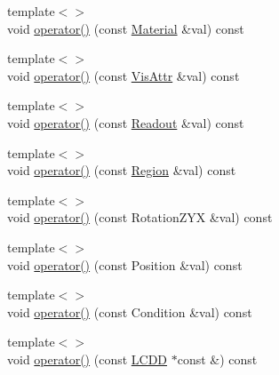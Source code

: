 \begin{DoxyCompactItemize}
\item 
{\footnotesize template$<$$>$ }\\void \hyperlink{struct_d_d4hep_1_1_printer_a28d6e698fccdabcfda67d3460012355a}{operator()} (const \hyperlink{class_d_d4hep_1_1_geometry_1_1_material}{Material} \&val) const
\item 
{\footnotesize template$<$$>$ }\\void \hyperlink{struct_d_d4hep_1_1_printer_a75af40a21128f843605984b619878a7e}{operator()} (const \hyperlink{class_d_d4hep_1_1_geometry_1_1_vis_attr}{VisAttr} \&val) const
\item 
{\footnotesize template$<$$>$ }\\void \hyperlink{struct_d_d4hep_1_1_printer_a81f7b0ce01f9aa05f670dab7bfcd0926}{operator()} (const \hyperlink{class_d_d4hep_1_1_geometry_1_1_readout}{Readout} \&val) const
\item 
{\footnotesize template$<$$>$ }\\void \hyperlink{struct_d_d4hep_1_1_printer_a9a184466159682beda92ac777baa0c59}{operator()} (const \hyperlink{class_d_d4hep_1_1_geometry_1_1_region}{Region} \&val) const
\item 
{\footnotesize template$<$$>$ }\\void \hyperlink{struct_d_d4hep_1_1_printer_a39503398afc129d7f2bc912e8ebc9324}{operator()} (const RotationZYX \&val) const
\item 
{\footnotesize template$<$$>$ }\\void \hyperlink{struct_d_d4hep_1_1_printer_a88343bb8ee9c514f04c9f82bce31ae11}{operator()} (const Position \&val) const
\item 
{\footnotesize template$<$$>$ }\\void \hyperlink{struct_d_d4hep_1_1_printer_a07e2ce42a673e4d054442f6b4ebbc63c}{operator()} (const Condition \&val) const
\item 
{\footnotesize template$<$$>$ }\\void \hyperlink{struct_d_d4hep_1_1_printer_a4926e2d73384ba7456382d8da861efa6}{operator()} (const \hyperlink{class_d_d4hep_1_1_geometry_1_1_l_c_d_d}{LCDD} $\ast$const \&) const
\end{DoxyCompactItemize}
